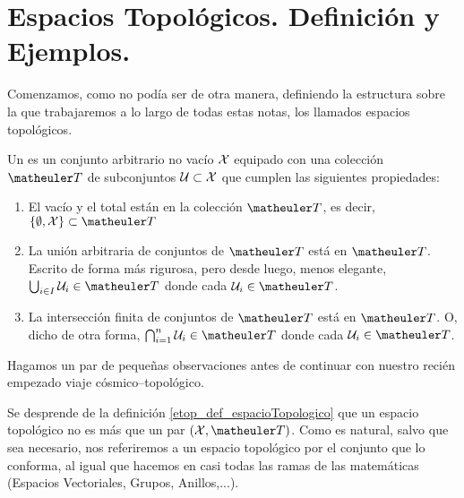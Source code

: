 \section{Espacios Topológicos. Definición y Ejemplos.}
\label{etop_definicionEjemplos}
Comenzamos, como no podía ser de otra manera, definiendo la estructura sobre la que trabajaremos a lo largo de todas estas notas, los llamados espacios topológicos.
\begin{defi}[Espacio Topológico]
	\label{etop_def_espacioTopologico}
	Un  es un conjunto arbitrario no vacío $\mathcal{X}$ equipado con una colección $\T$ de subconjuntos $\mathcal{U}\subset\mathcal{X}$ que cumplen las siguientes propiedades:
	\begin{enumerate}
		\item[\tb{T1}] El vacío y el total están en la colección $\T$, es decir, $\{\emptyset, \X\} \subset \T$
		\item[\tb{T2}] La unión arbitraria de conjuntos de $\T$ está en $\T$. Escrito de forma más rigurosa, pero desde luego, menos elegante, 
		$\bigcup_{i\in I}\U_i\in\T$ donde cada $\U_i\in\T$.
		\item[\tb{T3}] La intersección finita de conjuntos de $\T$ está en $\T$. O, dicho de otra forma, $\bigcap_{i=1}^{n}\U_i\in\T$ donde cada $\U_i\in\T$.
	\end{enumerate}
\end{defi}
Hagamos un par de pequeñas observaciones antes de continuar con nuestro recién empezado viaje cósmico--topológico.
\begin{obs}[Sutilezas]
	\label{etop_obs_sutilezas}
	Se desprende de la definición \ref{etop_def_espacioTopologico} que un espacio topológico no es más que un par $(\X, \T)$. Como es natural, salvo que sea necesario, nos referiremos a un espacio topológico por el conjunto que lo conforma, al igual que hacemos en casi todas las ramas de las matemáticas (Espacios Vectoriales, Grupos, Anillos,...).
\end{obs}
